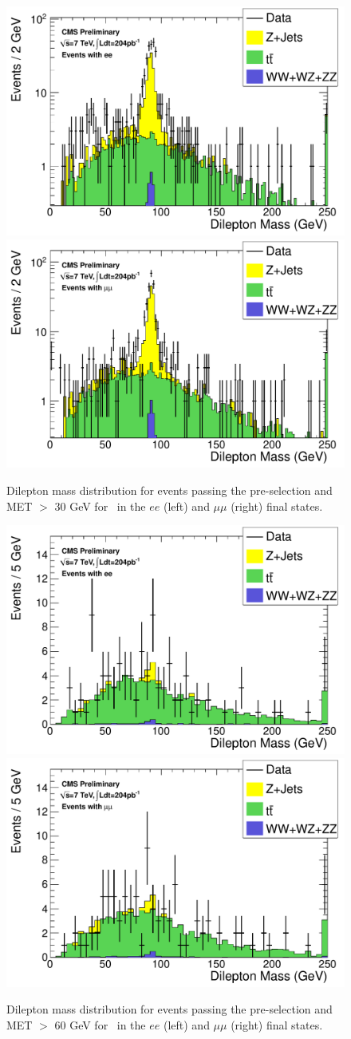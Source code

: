 \begin{figure}[hbt]
  \begin{center}
	\includegraphics[width=0.48\linewidth]{plots/hdilmass_pfmet30_ee_allj.pdf}
	\includegraphics[width=0.48\linewidth]{plots/hdilmass_pfmet30_mm_allj.pdf}
	\caption{
	  \label{fig:dilmass30}\protect 
	  Dilepton mass distribution for events passing the pre-selection 
	  and MET $>$ 30 GeV for \lumi\ in the $ee$ (left) and $\mu\mu$ (right) final states. 
	}
  \end{center}
\end{figure}

\begin{figure}[hbt]
  \begin{center}
	\includegraphics[width=0.48\linewidth]{plots/hdilmass_pfmet60_ee_allj.pdf}
	\includegraphics[width=0.48\linewidth]{plots/hdilmass_pfmet60_mm_allj.pdf}
	\caption{
	  \label{fig:dilmass60}\protect 
	  Dilepton mass distribution for events passing the pre-selection 
	  and MET $>$ 60 GeV for \lumi\ in the $ee$ (left) and $\mu\mu$ (right) final states. 
	}
  \end{center}
\end{figure}


